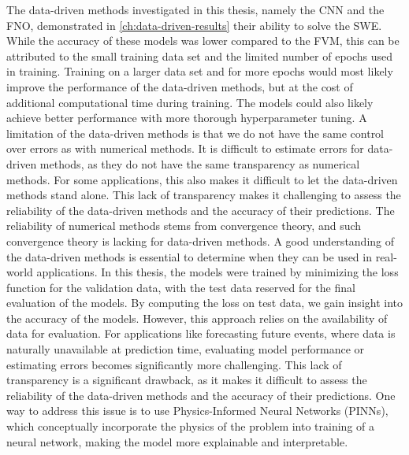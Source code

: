 The data-driven methods investigated in this thesis, namely the CNN and the FNO, demonstrated in \autoref{ch:data-driven-results} their ability to solve the SWE.
While the accuracy of these models was lower compared to the FVM, this can be attributed to the small training data set and the limited number of epochs used in training.
Training on a larger data set and for more epochs would most likely improve the performance of the data-driven methods, but at the cost of additional computational time during training.
The models could also likely achieve better performance with more thorough hyperparameter tuning.
A limitation of the data-driven methods is that we do not have the same control over errors as with numerical methods.
It is difficult to estimate errors for data-driven methods, as they do not have the same transparency as numerical methods.
For some applications, this also makes it difficult to let the data-driven methods stand alone.
This lack of transparency makes it challenging to assess the reliability of the data-driven methods and the accuracy of their predictions.
The reliability of numerical methods stems from convergence theory, and such convergence theory is lacking for data-driven methods.
A good understanding of the data-driven methods is essential to determine when they can be used in real-world applications.
In this thesis, the models were trained by minimizing the loss function for the validation data, with the test data reserved for the final evaluation of the models.
By computing the loss on test data, we gain insight into the accuracy of the models.
However, this approach relies on the availability of data for evaluation.
For applications like forecasting future events, where data is naturally unavailable at prediction time, evaluating model performance or estimating errors becomes significantly more challenging.
This lack of transparency is a significant drawback, as it makes it difficult to assess the reliability of the data-driven methods and the accuracy of their predictions.
One way to address this issue is to use Physics-Informed Neural Networks (PINNs), which conceptually incorporate the physics of the problem into training of a neural network, making the model more explainable and interpretable.

